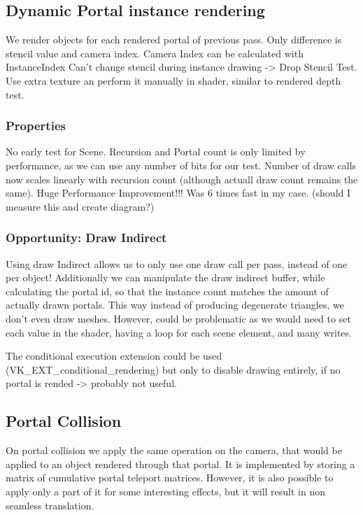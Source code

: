 \subsection{Dynamic Portal instance rendering}
We render objects for each rendered portal of previous pass. Only difference is stencil value and camera index.
Camera Index can be calculated with InstanceIndex
Can't change stencil during instance drawing -> Drop Stencil Test. Use extra texture an perform it manually in shader, similar to rendered depth test. 

\subsubsection{Properties}
No early test for Scene.
Recursion and Portal count is only limited by performance, as we can use any number of bits for our test.
Number of draw calls now scales linearly with recursion count (although actuall draw count remains the same).
Huge Performance Improvement!!! Was 6 times fast in my case. 
(should I measure this and create diagram?)

\subsubsection{Opportunity: Draw Indirect}
Using draw Indirect allows us to only use one draw call per pass, instead of one per object!
Additionally we can manipulate the draw indirect buffer, while calculating the portal id, so that the instance count matches the amount of actually drawn portals.
This way instead of producing degenerate triangles, we don't even draw meshes.
However, could be problematic as we would need to set each value in the shader, having a loop for each scene element, and many writes.

The conditional execution extension could be used (VK\_EXT\_conditional\_rendering) but only to disable drawing entirely, if no portal is rended -> probably not useful.

\subsection{Portal Collision}
On portal collision we apply the same operation on the camera, that would be applied to an object rendered through that portal.
It is implemented by storing a matrix of cumulative portal teleport matrices.
However, it is also possible to apply only a part of it for some interesting effects, but it will result in non seamless translation.

